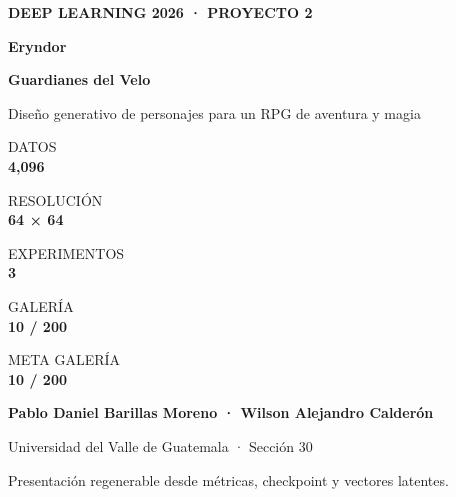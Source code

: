 \documentclass[10pt]{article}
\newcommand{\eyebrow}[1]{{\fontsize{10}{12}\selectfont\bfseries\color{MineralCyan}\MakeUppercase{#1}}}
\newcommand{\bigstat}[2]{%
  \colorbox{CosmicBlue}{\parbox[c][0.88in][c]{2.55in}{\centering
    {\scriptsize\color{Silver}#1}\\[-1pt]
    {\fontsize{21}{24}\selectfont\bfseries\color{white}#2}}}%
}
\begin{document}
\clearpage
\thispagestyle{empty}
\noindent\colorbox{Obsidian}{\parbox[c][\paperheight][c]{\paperwidth}{
\hspace*{0.72in}\begin{minipage}{11.7in}
  \eyebrow{Deep Learning 2026 · Proyecto 2}\par
  \vspace{0.22in}
  {\fontsize{42}{46}\selectfont\bfseries\color{white}Eryndor}\par
  {\fontsize{29}{34}\selectfont\bfseries\color{Lavender}Guardianes del Velo}\par
  \vspace{0.22in}
  {\Large\color{Silver}Diseño generativo de personajes para un RPG de aventura y magia}\par
  \vspace{0.55in}
  \bigstat{DATOS}{4,096}\hspace{0.16in}
  \bigstat{RESOLUCIÓN}{64 × 64}\hspace{0.16in}
  \bigstat{EXPERIMENTOS}{3}\hspace{0.16in}
  \ifgalleryready\bigstat{GALERÍA}{10 / 200}\else\bigstat{META GALERÍA}{10 / 200}\fi\par
  \vspace{0.62in}
  {\large\bfseries\color{MineralCyan}Pablo Daniel Barillas Moreno · Wilson Alejandro Calderón}\par
  {\normalsize\color{Lavender}Universidad del Valle de Guatemala · Sección 30}\par
  \vspace{0.25in}
  {\small\color{Silver}Presentación regenerable desde métricas, checkpoint y vectores latentes.}
\end{minipage}}}
\end{document}
